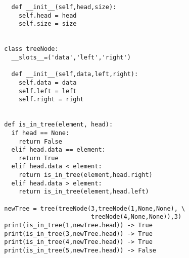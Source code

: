 \documentclass[11pt]{article}
\newenvironment{answer}{\large\lstset{basicstyle=\large}\color{white}}{}
\newenvironment{answer}{\large\lstset{basicstyle=\large}\color{red}}{}
\begin{document}
\begin{enumerate}
\begin{answer}
\begin{lstlisting}
          def __init__(self,head,size):
            self.head = head
            self.size = size

  
        class treeNode:
          __slots__=('data','left','right')
    
          def __init__(self,data,left,right):
            self.data = data
            self.left = left
            self.right = right


        def is_in_tree(element, head):
          if head == None:
            return False
          elif head.data == element:
            return True
          elif head.data < element:
            return is_in_tree(element,head.right)
          elif head.data > element:
            return is_in_tree(element,head.left)

        newTree = tree(treeNode(3,treeNode(1,None,None), \
                                treeNode(4,None,None)),3)
        print(is_in_tree(1,newTree.head)) -> True
        print(is_in_tree(3,newTree.head)) -> True
        print(is_in_tree(4,newTree.head)) -> True
        print(is_in_tree(5,newTree.head)) -> False
        \end{lstlisting}
        \end{answer}
        \pagebreak

\end{enumerate}
\end{document}
